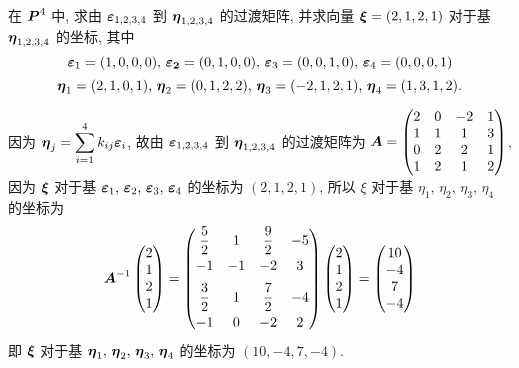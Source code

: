 \begin{example}
    在 $\vb*{P}^4$ 中, 求由 $\vb*{\varepsilon}_{1,2,3,4}$ 到 $\vb*{\eta}_{1,2,3,4}$ 的过渡矩阵, 并求向量 $\vb*{\xi}=(2,1,2,1)$ 对于基 $\vb*{\eta}_{1,2,3,4}$ 的坐标, 其中
    $$\vb*{\varepsilon}_1=(1,0,0,0)\text{, }\vb*{\varepsilon_2}=(0,1,0,0)\text{, }\vb*{\varepsilon}_3=(0,0,1,0)\text{, }\vb*{\varepsilon}_4=(0,0,0,1)$$
    $$\vb*{\eta}_1=(2,1,0,1)\text{, }\vb*{\eta}_2=(0,1,2,2)\text{, }\vb*{\eta}_3=(-2,1,2,1)\text{, }\vb*{\eta}_4=(1,3,1,2).$$
\end{example}
\begin{solution}
    因为 $\displaystyle \vb*{\eta}_j=\sum_{i=1}^{4}k_{ij}\vb*{\varepsilon}_{i}$, 故由 $\vb*{\varepsilon}_{1,2,3,4}$ 到 $\vb*{\eta}_{1,2,3,4}$ 的过渡矩阵为 $\vb*{A}=\begin{pmatrix}
            2 & 0 & -2 & 1 \\
            1 & 1 & 1  & 3 \\
            0 & 2 & 2  & 1 \\
            1 & 2 & 1  & 2
        \end{pmatrix}$, 因为 $\vb*{\xi}$ 对于基 $\vb*{\varepsilon}_1\text{, }\vb*{\varepsilon}_2\text{, }\vb*{\varepsilon}_3\text{, }\vb*{\varepsilon}_4$ 的坐标为 $(2,1,2,1)$, 所以 $\xi$ 对于基 $\eta_1\text{, }\eta_2\text{, }\eta_3\text{, }\eta_4$ 的坐标为
    $$\vb*{A}^{-1}\begin{pmatrix}
            2 \\
            1 \\
            2 \\
            1
        \end{pmatrix}=\begin{pmatrix}
            \dfrac{5}{2} & 1  & \dfrac{9}{2} & -5 \\[6pt]
            -1           & -1 & -2           & 3  \\[6pt]
            \dfrac{3}{2} & 1  & \dfrac{7}{2} & -4 \\[6pt]
            -1           & 0  & -2           & 2
        \end{pmatrix}\begin{pmatrix}
            2 \\
            1 \\
            2 \\
            1
        \end{pmatrix}=\begin{pmatrix}
            10 \\
            -4 \\
            7  \\
            -4
        \end{pmatrix}$$
    即 $\vb*{\xi}$ 对于基 $\vb*{\eta}_1\text{, }\vb*{\eta}_2\text{, }\vb*{\eta}_3\text{, }\vb*{\eta}_4$ 的坐标为 $(10,-4,7,-4).$
\end{solution}


